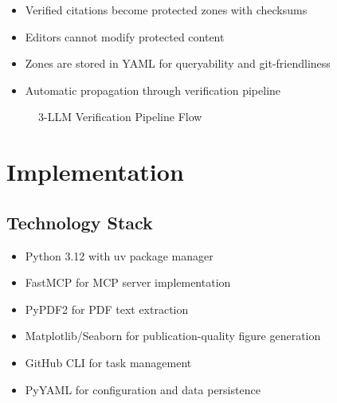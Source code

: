 \documentclass{article}
\begin{document}
\begin{itemize}
    \item Verified citations become protected zones with checksums
    \item Editors cannot modify protected content
    \item Zones are stored in YAML for queryability and git-friendliness
    \item Automatic propagation through verification pipeline
\end{itemize}

\begin{figure}[h]
\centering
{}
\caption{3-LLM Verification Pipeline Flow}
\label{fig:pipeline}
\end{figure}

\section{Implementation}
\label{sec:implementation}

\subsection{Technology Stack}

\begin{itemize}
    \item Python 3.12 with uv package manager
    \item FastMCP for MCP server implementation
    \item PyPDF2 for PDF text extraction
    \item Matplotlib/Seaborn for publication-quality figure generation
    \item GitHub CLI for task management
    \item PyYAML for configuration and data persistence
\end{itemize}
\end{document}
